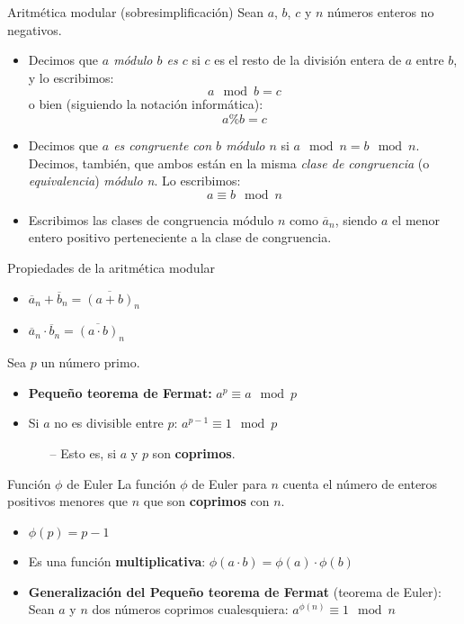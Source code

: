 \documentclass[10pt]{beamer} %
\begin{document}
\begin{frame}{Aritmética modular (sobresimplificación)}
Sean $a$, $b$, $c$ y $n$ números enteros no negativos.
\begin{itemize}
    \item Decimos que \textit{$a$ módulo $b$ es $c$} si $c$ es el resto de la división entera de $a$ entre $b$, y lo escribimos: \[a\mod b = c\] o bien (siguiendo la notación informática): \[a \% b = c\]
    \item Decimos que \textit{$a$ es congruente con $b$ módulo $n$} si $a\mod n = b\mod n$. Decimos, también, que ambos están en la misma \textit{clase de congruencia} (o \textit{equivalencia}) \textit{módulo n}. Lo escribimos: \[a \equiv b \mod n\]
    \item Escribimos las clases de congruencia módulo $n$ como $\overline{a}_n$, siendo $a$ el menor entero positivo perteneciente a la clase de congruencia.
\end{itemize}
\end{frame}
\begin{frame}{Propiedades de la aritmética modular}
\begin{itemize}
    \item $\overline{a}_n + \overline{b}_n = \overline{(a + b)}_n$
    \item $\overline{a}_n \cdot \overline{b}_n = \overline{(a \cdot b)}_n$
\end{itemize}
Sea $p$ un número primo.
\begin{itemize}
    \item \textbf{Pequeño teorema de Fermat:} $a^p \equiv a \mod p$
    \item Si $a$ no es divisible entre $p$: $a^{p-1} \equiv 1 \mod p$
    \begin{itemize}
        \item[--] Esto es, si $a$ y $p$ son \textbf{coprimos}.
    \end{itemize}
\end{itemize}
\end{frame}
\begin{frame}{Función $\phi$ de Euler}
La función $\phi$ de Euler para $n$ cuenta el número de enteros positivos menores que $n$ que son \textbf{coprimos} con $n$.
\begin{itemize}
    \item $\phi(p) = p-1$
    \item Es una función \textbf{multiplicativa}: $\phi(a\cdot b) = \phi(a) \cdot \phi(b)$
    \item \textbf{Generalización del Pequeño teorema de Fermat} (teorema de Euler):\\ Sean $a$ y $n$ dos números coprimos cualesquiera: $a^{\phi(n)}\equiv 1 \mod n$
\end{itemize}
\end{frame}
\end{document}
